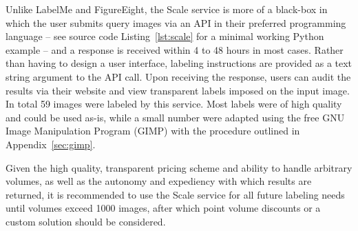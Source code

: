 \documentclass[11pt]{article} %
\begin{document}
\begin{enumerate}
Unlike LabelMe and FigureEight, the Scale service is more of a black-box in 
which the user submits query images via an API in their preferred programming
language -- see source code Listing~\ref{lst:scale} for a minimal working 
Python example -- and a response is received within 4 to 48 hours in most 
cases. Rather than having to design a user interface, labeling instructions are 
provided as a text string argument to the API call. Upon receiving the 
response, users can audit the results via their website and view transparent 
labels imposed on the input image. In total 59 images were labeled by this 
service. Most labels were of high quality and could be used as-is, while a 
small number were adapted using the free GNU Image Manipulation Program (GIMP) 
with the procedure outlined in Appendix~\ref{sec:gimp}.

\end{enumerate}

Given the high quality, transparent pricing scheme and ability to handle
arbitrary volumes, as well as the autonomy and expediency with which results 
are returned, it is recommended to use the Scale service for all future 
labeling needs until volumes exceed 1000 images, after which point volume 
discounts or a custom solution should be considered.
\end{document}

